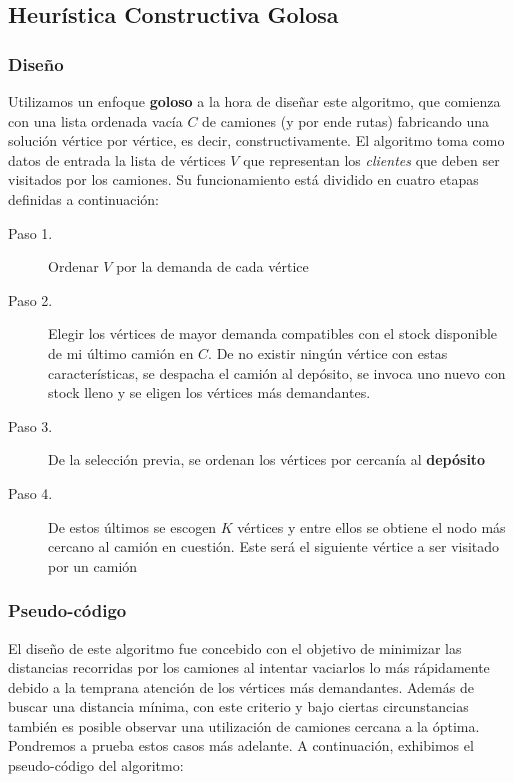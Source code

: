 \subsection{Heurística Constructiva Golosa}
\subsubsection{Diseño}
Utilizamos un enfoque \textbf{goloso} a la hora de diseñar este algoritmo, que comienza con una lista ordenada vacía $C$ de camiones (y por ende rutas) fabricando una solución vértice por vértice, es decir, constructivamente. El algoritmo toma como datos de entrada la lista de vértices $V$ que representan los \textit{clientes} que deben ser visitados por los camiones. Su funcionamiento está dividido en cuatro etapas definidas a continuación:

\begin{description}
\item[Paso 1.] Ordenar $V$ por la demanda de cada vértice
\item[Paso 2.] Elegir los vértices de mayor demanda compatibles con el stock disponible de mi último camión en $C$. De no existir ningún vértice con estas características, se despacha el camión al depósito, se invoca uno nuevo con stock lleno y se eligen los vértices más demandantes.
\item[Paso 3.] De la selección previa, se ordenan los vértices por cercanía al \textbf{depósito}
\item[Paso 4.] De estos últimos se escogen $K$ vértices y entre ellos se obtiene el nodo más cercano al camión en cuestión. Este será el siguiente vértice a ser visitado por un camión
\end{description}

\subsubsection{Pseudo-código}
El diseño de este algoritmo fue concebido con el objetivo de minimizar las distancias recorridas por los camiones al intentar vaciarlos lo más rápidamente debido a la temprana atención de los vértices más demandantes. Además de buscar una distancia mínima, con este criterio y bajo ciertas circunstancias también es posible observar una utilización de camiones cercana a la óptima. Pondremos a prueba estos casos más adelante. A continuación, exhibimos el pseudo-código del algoritmo:

